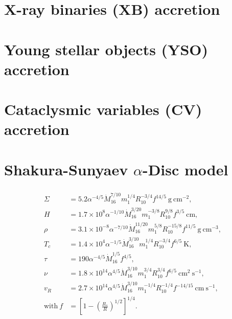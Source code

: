 \section{X-ray binaries (XB) accretion}

\section{Young stellar objects (YSO) accretion}

\section{Cataclysmic variables (CV) accretion}

\section[Shakura-Sunyaev $\alpha$-Disc model]{Shakura-Sunyaev $\alpha$-Disc model}
\begin{align}
\begin{split}
\Sigma 	&= 5.2 \alpha^{-4/5} \dot{M}^{7/10}_{16} m^{1/4}_1 R^{-3/4}_{10} f^{14/5}\ \mathrm{g\ cm^{-2}}, \\
H		&= 1.7 \times 10^8 \alpha^{-1/10} \dot{M}^{3/20}_{16} m^{-3/8}_1 R^{9/8}_{10} f^{3/5}\ \mathrm{cm}, \\
\rho		&= 3.1 \times 10^{-8} \alpha^{-7/10} \dot{M}^{11/20}_{16} m^{5/8}_1 R^{-15/8}_{10} f^{11/5}\ \mathrm{g\ cm^{-3}}, \\
T_c		&= 1.4 \times 10^4 \alpha^{-1/5} \dot{M}^{3/10}_{16} m^{1/4}_1 R^{-3/4}_{10} f^{6/5}\ \mathrm{K}, \\
\tau		&= 190 \alpha^{-4/5} \dot{M}^{1/5}_{16} f^{4/5}, \\
\nu		&= 1.8 \times 10^{14} \alpha^{4/5} \dot{M}^{3/10}_{16} m^{3/4}_1 R^{3/4}_{10} f^{6/5}\ \mathrm{cm^2\ s^{-1}},  \\
v_R		&= 2.7 \times 10^{14} \alpha^{4/5} \dot{M}^{3/10}_{16} m^{-1/4}_1 R^{-1/4}_{10} f^{-14/15}\ \mathrm{cm\ s^{-1}},  \\
\mathrm{with}\ f		&= \left[ 1 - \left( \frac{R_*}{R} \right)^{1/2} \right]^{1/4}. \\
\end{split}
\label{eq:alpha_model}
\end{align}
